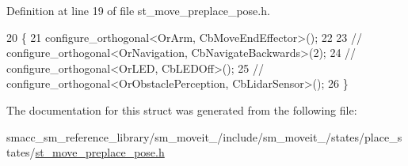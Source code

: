 Definition at line 19 of file st\+\_\+move\+\_\+preplace\+\_\+pose.\+h.


\begin{DoxyCode}
20     \{
21         configure\_orthogonal<OrArm, CbMoveEndEffector>();
22 
23         \textcolor{comment}{//   configure\_orthogonal<OrNavigation, CbNavigateBackwards>(2);}
24         \textcolor{comment}{//   configure\_orthogonal<OrLED, CbLEDOff>();}
25         \textcolor{comment}{//   configure\_orthogonal<OrObstaclePerception, CbLidarSensor>();}
26     \}
\end{DoxyCode}


The documentation for this struct was generated from the following file\+:\begin{DoxyCompactItemize}
\item 
smacc\+\_\+sm\+\_\+reference\+\_\+library/sm\+\_\+moveit\+\_/include/sm\+\_\+moveit\+\_/states/place\+\_\+states/\hyperlink{3_2include_2sm__moveit__3_2states_2place__states_2st__move__preplace__pose_8h}{st\+\_\+move\+\_\+preplace\+\_\+pose.\+h}\end{DoxyCompactItemize}
